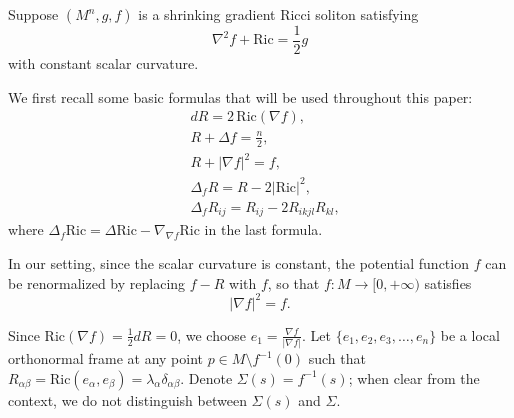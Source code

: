 \documentclass[a4, 12pt]{amsart}
\theoremstyle{plain}
\begin{document}
Suppose $(M^n, g, f)$ is a shrinking gradient Ricci soliton satisfying
\begin{equation}\label{soliton-equation}
	\nabla^2 f + \mathrm{Ric} = \frac{1}{2}g
\end{equation}
with constant scalar curvature.

We first recall some basic formulas that will be used throughout this paper:
\begin{align}
	&dR = 2\,\mathrm{Ric}(\nabla f), \label{second-bianchi}\\
	&R + \Delta f = \frac{n}{2}, \label{trace-soliton}\\
	&R + |\nabla f|^2 = f, \label{f-gradient}\\
	&\Delta_f R = R - 2|\mathrm{Ric}|^2, \label{drift-laplacian-scalar}\\
	&\Delta_f R_{ij} = R_{ij} - 2R_{ikjl}R_{kl}, \label{elliptic-equation}
\end{align}
where $\Delta_f \mathrm{Ric} = \Delta \mathrm{Ric} - \nabla_{\nabla f}\mathrm{Ric}$ in the last formula.

In our setting, since the scalar curvature is constant, the potential function $f$ can be renormalized by replacing $f - R$ with $f$, so that $f: M \to [0, +\infty)$ satisfies
\begin{equation}\label{iso1}
	|\nabla f|^2 = f.
\end{equation}

Since $\mathrm{Ric}(\nabla f) = \frac{1}{2}dR = 0$, we choose $e_1 = \frac{\nabla f}{|\nabla f|}$. Let $\{e_1, e_2, e_3, \ldots, e_n\}$ be a local orthonormal frame at any point $p \in M \setminus f^{-1}(0)$ such that $R_{\alpha\beta} = \mathrm{Ric}(e_\alpha, e_\beta) = \lambda_\alpha \delta_{\alpha\beta}$. Denote $\Sigma(s) = f^{-1}(s)$; when clear from the context, we do not distinguish between $\Sigma(s)$ and $\Sigma$.
\end{document}
